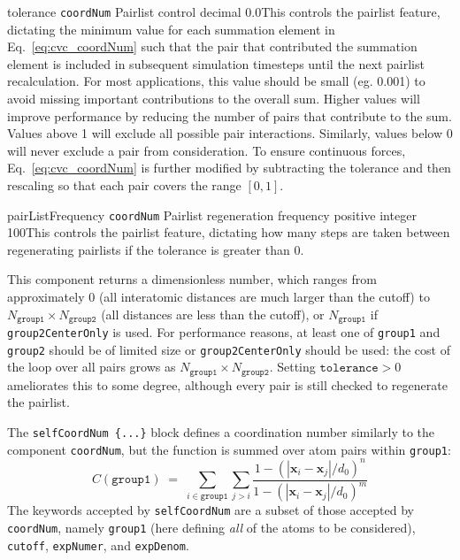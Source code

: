 \begin{cvcoptions}
\item %
    \keydef
     {tolerance}{%
     \texttt{coordNum}}{%
     Pairlist control}{%
    decimal}{%
    0.0}{This controls the pairlist feature, dictating the minimum value for each summation element in Eq.~\ref{eq:cvc_coordNum} such that the pair that contributed the summation element is included in subsequent simulation timesteps until the next pairlist recalculation. For most applications, this value should be small (eg. 0.001) to avoid missing important contributions to the overall sum. Higher values will improve performance by reducing the number of pairs that contribute to the sum. Values above 1 will exclude all possible pair interactions. Similarly, values below 0 will never exclude a pair from consideration. To ensure continuous forces, Eq.~\ref{eq:cvc_coordNum} is further modified by subtracting the tolerance and then rescaling so that each pair covers the range $\left[0, 1\right]$.
  }

\item %
    \keydef
     {pairListFrequency}{%
     \texttt{coordNum}}{%
     Pairlist regeneration frequency}{%
    positive integer}{%
    100}{This controls the pairlist feature, dictating how many steps are taken between regenerating pairlists if the tolerance is greater than 0.
  }
\end{cvcoptions}

This component returns a dimensionless number, which ranges from
approximately 0 (all interatomic distances are much larger than the
cutoff) to $N_{\mathtt{group1}} \times N_{\mathtt{group2}}$ (all distances
are less than the cutoff), or $N_{\mathtt{group1}}$ if
\texttt{group2CenterOnly} is used.  For performance reasons, at least
one of \texttt{group1} and \texttt{group2} should be of limited size or \texttt{group2CenterOnly} should be used: the cost of the loop over all pairs grows as $N_{\mathtt{group1}} \times N_{\mathtt{group2}}$.
Setting $\mathtt{tolerance} > 0$ ameliorates this to some degree, although every pair is still checked to regenerate the pairlist.




The \texttt{selfCoordNum \{...\}} block defines
a coordination number similarly to the component \texttt{coordNum},
but the function is summed over atom pairs within \texttt{group1}:
\begin{equation}
  \label{eq:cvc_selfCoordNum}
  C (\mathtt{group1}) \; = \;
  \sum_{i\in\mathtt{group1}}\sum_{j > i} {
    \frac{1 - (|\mathbf{x}_{i}-\mathbf{x}_{j}|/d_{0})^{n}}{
      1 - (|\mathbf{x}_{i}-\mathbf{x}_{j}|/d_{0})^{m} }
  }
\end{equation}
The keywords accepted by \texttt{selfCoordNum} are a subset of
those accepted by \texttt{coordNum}, namely \texttt{group1}
(here defining \emph{all} of the atoms to be considered),
\texttt{cutoff}, \texttt{expNumer}, and \texttt{expDenom}.

